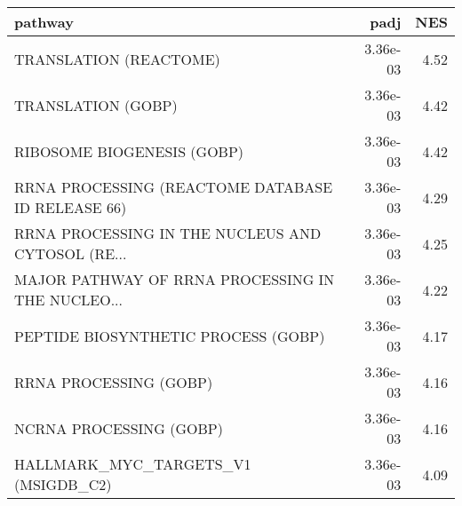 \begin{tabular}{lrr}
\toprule
                                           pathway &      padj &   NES \\
\midrule
                            TRANSLATION (REACTOME) &  3.36e-03 &  4.52 \\
                                TRANSLATION (GOBP) &  3.36e-03 &  4.42 \\
                        RIBOSOME BIOGENESIS (GOBP) &  3.36e-03 &  4.42 \\
 RRNA PROCESSING (REACTOME DATABASE ID RELEASE 66) &  3.36e-03 &  4.29 \\
 RRNA PROCESSING IN THE NUCLEUS AND CYTOSOL (RE... &  3.36e-03 &  4.25 \\
 MAJOR PATHWAY OF RRNA PROCESSING IN THE NUCLEO... &  3.36e-03 &  4.22 \\
               PEPTIDE BIOSYNTHETIC PROCESS (GOBP) &  3.36e-03 &  4.17 \\
                            RRNA PROCESSING (GOBP) &  3.36e-03 &  4.16 \\
                           NCRNA PROCESSING (GOBP) &  3.36e-03 &  4.16 \\
               HALLMARK\_MYC\_TARGETS\_V1 (MSIGDB\_C2) &  3.36e-03 &  4.09 \\
\bottomrule
\end{tabular}
